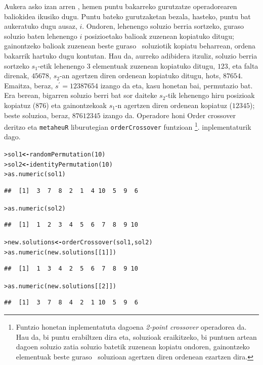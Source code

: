 \documentclass[eu]{ifirak}\usepackage[]{graphicx}\usepackage[]{color}
\makeatletter
\newcommand{\hlnum}[1]{\textcolor[rgb]{0.659,0.4,0.051}{#1}}%
\newcommand{\hlstd}[1]{\textcolor[rgb]{0,0,0}{#1}}%
\newcommand{\hlkwb}[1]{\textcolor[rgb]{0.549,0.114,0.412}{\textbf{#1}}}%
\newcommand{\hlkwd}[1]{\textcolor[rgb]{0.659,0.133,0.482}{#1}}%
\newenvironment{kframe}{%
 \def\at@end@of@kframe{}%
 \ifinner\ifhmode%
  \def\at@end@of@kframe{\end{minipage}}%
  \begin{minipage}{\columnwidth}%
 \fi\fi%
 \def\FrameCommand##1{\hskip\@totalleftmargin \hskip-\fboxsep
 \colorbox{shadecolor}{##1}\hskip-\fboxsep
     \hskip-\linewidth \hskip-\@totalleftmargin \hskip\columnwidth}%
 \MakeFramed {\advance\hsize-\width
   \@totalleftmargin\z@ \linewidth\hsize
   \@setminipage}}%
 {\par\unskip\endMakeFramed%
 \at@end@of@kframe}
\newenvironment{knitrout}{}{} %
\newcommand{\zkk}{\guillemotleft}
\newcommand{\skk}{\guillemotright}
\newcommand{\code}[1]{\texttt{#1}}
\newcommand{\eng}[1]{\textit{#1}}
\newcommand{\hgl}[1]{\zkk #1\skk\ }
\makeatother
\begin{document}
Aukera asko izan arren \cite{talbi2009}, hemen puntu bakarreko gurutzatze operadorearen baliokidea ikusiko dugu. Puntu bateko gurutzaketan bezala, hasteko, puntu bat aukeratuko dugu ausaz, $i$. Ondoren, lehenengo soluzio berria sortzeko, \hgl{guraso} soluzio baten lehenengo $i$ posizioetako balioak zuzenean kopiatuko ditugu; gainontzeko balioak zuzenean beste \hgl{guraso} soluziotik kopiatu beharrean, ordena bakarrik hartuko dugu kontutan. Hau da, aurreko adibidera itzuliz, soluzio berria sortzeko $s_1$-etik lehenengo 3 elementuak zuzenean kopiatuko ditugu, $123$, eta falta direnak, $45678$, $s_2$-an agertzen diren ordenean kopiatuko ditugu, hots, $87654$. Emaitza, beraz, $s^\prime = 12387654$ izango da eta, kasu honetan bai, permutazio bat. Era berean, bigarren soluzio berri bat sor daiteke $s_2$-tik lehenengo hiru posizioak kopiatuz ($876$) eta gainontzekoak $s_1$-n agertzen diren ordenean kopiatuz ($12345$); beste soluzioa, beraz, $87612345$ izango da. Operadore honi \hgl{Order crossover} deritzo eta \code{metaheuR} liburutegian \code{orderCrossover} funtzioan \footnote{Funtzio honetan inplementatuta dagoena \eng{2-point crossover} operadorea da. Hau da, bi puntu erabiltzen dira eta, soluzioak eraikitzeko, bi puntuen artean dagoen soluzio zatia soluzio batetik zuzenean kopiatu ondoren, gainontzeko elementuak beste \hgl{guraso} soluzioan agertzen diren ordenean ezartzen dira.}.
 inplementaturik dago. 

\begin{knitrout}
\color{fgcolor}\begin{kframe}
\begin{alltt}
\hlstd{> }\hlstd{sol1} \hlkwb{<-} \hlkwd{randomPermutation}\hlstd{(}\hlnum{10}\hlstd{)}
\hlstd{> }\hlstd{sol2} \hlkwb{<-} \hlkwd{identityPermutation}\hlstd{(}\hlnum{10}\hlstd{)}
\hlstd{> }\hlkwd{as.numeric}\hlstd{(sol1)}
\end{alltt}
\begin{verbatim}
##  [1]  3  7  8  2  1  4 10  5  9  6
\end{verbatim}
\begin{alltt}
\hlstd{> }\hlkwd{as.numeric}\hlstd{(sol2)}
\end{alltt}
\begin{verbatim}
##  [1]  1  2  3  4  5  6  7  8  9 10
\end{verbatim}
\begin{alltt}
\hlstd{> }\hlstd{new.solutions} \hlkwb{<-} \hlkwd{orderCrossover}\hlstd{(sol1, sol2)}
\hlstd{> }\hlkwd{as.numeric}\hlstd{(new.solutions[[}\hlnum{1}\hlstd{]])}
\end{alltt}
\begin{verbatim}
##  [1]  1  3  4  2  5  6  7  8  9 10
\end{verbatim}
\begin{alltt}
\hlstd{> }\hlkwd{as.numeric}\hlstd{(new.solutions[[}\hlnum{2}\hlstd{]])}
\end{alltt}
\begin{verbatim}
##  [1]  3  7  8  4  2  1 10  5  9  6
\end{verbatim}
\end{kframe}
\end{knitrout}
\end{document}
